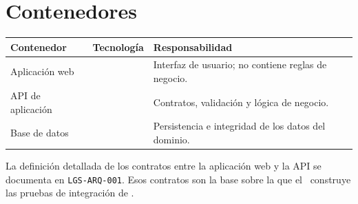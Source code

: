 \documentclass[11pt,a4paper]{article}
\begin{document}
\cleyenda

\section*{Contenedores}

\begin{center}
\begin{tabularx}{\linewidth}{@{}L{3.4cm} L{2.8cm} Y@{}}
\toprule
\sffamily\bfseries\color{lgPrimario}Contenedor &
\sffamily\bfseries\color{lgPrimario}Tecnología &
\sffamily\bfseries\color{lgPrimario}Responsabilidad \\
\midrule
Aplicación web     &  & Interfaz de usuario; no contiene reglas de negocio. \\
API de aplicación  &  & Contratos, validación y lógica de negocio. \\
Base de datos      &  & Persistencia e integridad de los datos del dominio. \\
\bottomrule
\end{tabularx}
\end{center}

\begin{nota}
La definición detallada de los contratos entre la aplicación web y la API se
documenta en \texttt{LGS-ARQ-001}. Esos contratos son la base sobre la que el
\lgQARol\ construye las pruebas de integración de .
\end{nota}
\end{document}
